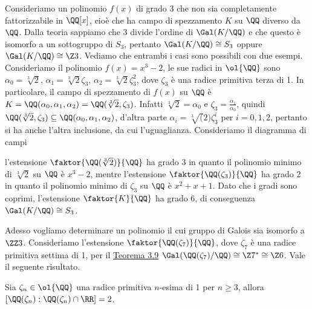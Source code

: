 \documentclass[11pt]{scrartcl}
\begin{document}
Consideriamo un polinomio $f(x)$ di grado 3 che non sia completamente fattorizzabile 
in $\QQ[x]$, cioè che ha campo di spezzamento $K$ 
su $\QQ$ diverso da $\QQ$. Dalla teoria sappiamo che 3 divide l'ordine di 
$\Gal(K/\QQ)$ e che questo è isomorfo a un sottogruppo di 
$S_3$, pertanto $\Gal(K/\QQ) \cong S_3$ oppure $\Gal(K/\QQ) \cong \Z3$. 
Vediamo che entrambi i casi sono possibili con due esempi.
\newline
Consideriamo il polinomio $f(x) = x^3 - 2$, le sue radici in $\ol{\QQ}$ sono 
$\alpha_0 = \sqrt[3]{2}$, $\alpha_1 = \sqrt[3]2 \zeta_3$,
$\alpha_2 = \sqrt[3]2\zeta_3^2$, dove $\zeta_3$ è una radice primitiva terza 
di 1. In particolare, il campo di spezzamento di $f(x)$ su $\QQ$
è $K = \QQ(\alpha_0, \alpha_1, \alpha_2) = \QQ(\sqrt[3]2, \zeta_3)$. Infatti 
$\sqrt[3]2 = \alpha_0$ e $\zeta_3 = \frac{\alpha_1}{\alpha_0}$,
quindi $\QQ(\sqrt[3]2, \zeta_3) \subseteq \QQ(\alpha_0, \alpha_1, \alpha_2)$, 
d'altra parte $\alpha_i = \sqrt[3](2)\zeta_3^i$ per 
$i = 0, 1, 2$, pertanto si ha anche l'altra inclusione, da cui l'uguaglianza. 
Consideriamo il diagramma di campi 
\begin{center}
\end{center}
l'estensione $\faktor{\QQ(\sqrt[3]2)}{\QQ}$ ha grado 3 in quanto il 
polinomio minimo di $\sqrt[3]2$ su $\QQ$ è $x^3 - 2$, mentre 
l'estensione $\faktor{\QQ(\zeta_3)}{\QQ}$ ha grado 2 in quanto il polinomio
 minimo di $\zeta_3$ su $\QQ$ è $x^2 + x + 1$. Dato 
che i gradi sono coprimi, l'estensione $\faktor{K}{\QQ}$ ha grado 6, di 
conseguenza $\Gal(K/\QQ) \cong S_3$.
\newline

Adesso vogliamo determinare un polinomio il cui gruppo di Galois sia 
isomorfo a $\ZZ3$. Consideriamo l'estensione $\faktor{\QQ(\zeta_7)}{\QQ}$,
dove $\zeta_7$ è una radice primitiva settima di 1, per il 
\hyperref[teorema3.9]{Teorema 3.9} $\Gal(\QQ(\zeta_7)/\QQ) \cong \Z7^* \cong \Z6$.
Vale il seguente risultato.

\begin{proposition}
    Sia $\zeta_n \in \ol{\QQ}$ una radice primitiva $n$-esima di 1 per $n \geq 3$,
    allora $[\QQ(\zeta_n):\QQ(\zeta_n)\cap \RR] = 2$.
\end{proposition}
\end{document}
